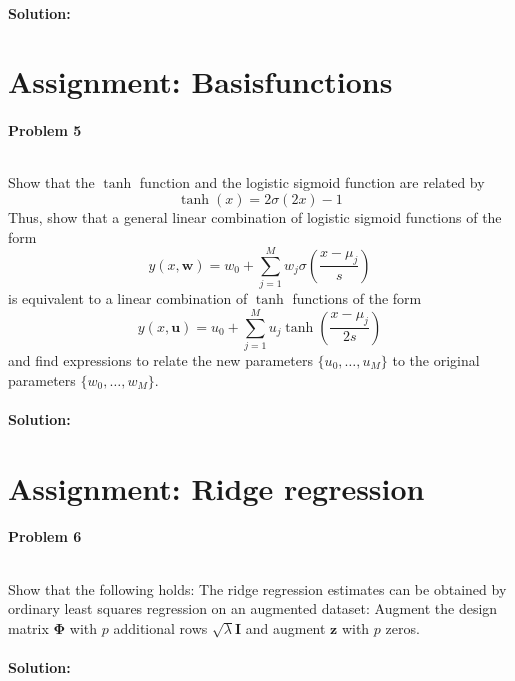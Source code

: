 \documentclass{article}
\renewcommand{\Vec}[1]{\ensuremath{\mathbf{#1}}}
\newcommand{\Mtx}[1]{\ensuremath{\mathbf{#1}}}
\begin{document}
\paragraph*{Solution:}





\section{Assignment: Basisfunctions }
\paragraph*{Problem 5}
$\;$ 

Show that the $\tanh$ function and the logistic sigmoid function are related
by 
\[
\tanh(x) = 2\sigma(2x) - 1
\]
Thus, show that a general linear combination of logistic sigmoid functions
of the form
\[
y(x, \Vec{w}) = w_0 + \sum_{j=1}^{M} w_j \sigma\left(\frac{x - \mu_j}{s}\right)
\]
is equivalent to a linear combination of $\tanh$ functions of the form
\[
y(x, \Vec{u}) = u_0 + \sum_{j=1}^{M} u_j \tanh\left(\frac{x - \mu_j}{2s}\right)
\]
and find expressions to relate the new parameters $\{u_0, \dots, u_M\}$ to 
the original parameters $\{w_0, \dots, w_M \}$.

\paragraph*{Solution:}




\section{Assignment: Ridge regression }
\paragraph*{Problem 6}
$\;$ 

Show that the following holds:
The ridge regression estimates can be obtained by ordinary
least squares regression on an augmented dataset: Augment the
design matrix $\Mtx{\Phi}$ with $p$ additional rows  $\sqrt{\lambda}\Mtx{I}$
and augment $\Vec{z}$ with $p$ zeros.

\paragraph*{Solution:}
\end{document}
